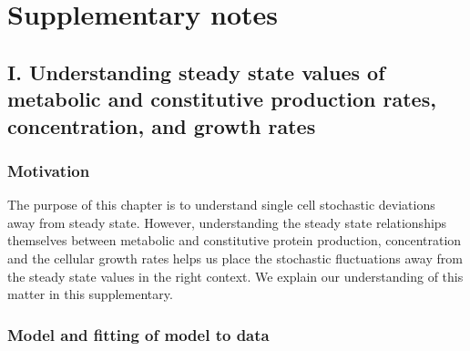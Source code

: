 
\clearpage
\FloatBarrier
\section*{Supplementary notes}

\subsection*{I. Understanding steady state values of metabolic and constitutive production rates, concentration, and growth rates}

\subsubsection{Motivation}
The purpose of this chapter is to understand 
single cell stochastic deviations away from steady state. 
%
However, understanding the steady state relationships themselves between metabolic and constitutive protein production, concentration and the cellular growth rates helps us place the stochastic fluctuations away from the steady state values in the right context.
%
We explain our understanding of this matter in this supplementary. %

\subsubsection{Model and fitting of model to data}

